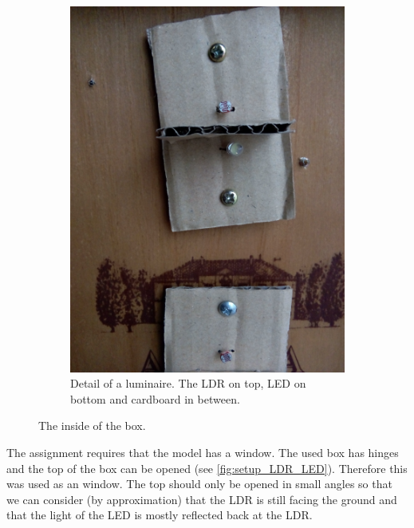 \begin{figure}[h]
\begin{subfigure}[t]{0.49\textwidth}
        \centering
        \includegraphics[width=\textwidth]{img/setup_LDR_LED}
        \caption{Detail of a luminaire. The LDR on top, LED on bottom and cardboard in between.}
        \label{fig:setup_LDR_LED}
    \end{subfigure}
    \caption{The inside of the box.}
    \label{fig:setup_box_inside}
\end{figure}

The assignment requires that the model has a window. The used box has hinges and the top of the box can be opened (see \autoref{fig:setup_LDR_LED}). Therefore this was used as an window. The top should only be opened in small angles so that we can consider (by approximation) that the LDR is still facing the ground and that the light of the LED is mostly reflected back at the LDR.


